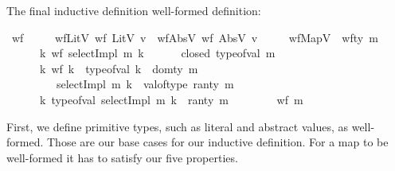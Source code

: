 The final inductive definition well-formed definition:

\begin{isabellebody}\isanewline
{}\isamarkupfalse%
\ wf\ \isanewline
\ \ \ \ wfLitV{\isacharcolon}{\kern0pt}\ {\isachardoublequoteopen}wf\ {\isacharparenleft}{\kern0pt}LitV\ v{\isacharparenright}{\kern0pt}{\isachardoublequoteclose}\ {\isacharbar}{\kern0pt}\ wfAbsV{\isacharcolon}{\kern0pt}\ {\isachardoublequoteopen}wf\ {\isacharparenleft}{\kern0pt}AbsV\ v{\isacharparenright}{\kern0pt}{\isachardoublequoteclose}\ {\isacharbar}{\kern0pt}\isanewline
\ \ \ \ wfMapV{\isacharcolon}{\kern0pt}\ {\isachardoublequoteopen}{\isasymlbrakk}\ wf{\isacharunderscore}{\kern0pt}ty\ m{\isacharsemicolon}{\kern0pt}\isanewline
\ \ \ \ \ \ {\isacharparenleft}{\kern0pt}{\isasymforall}k{\isachardot}{\kern0pt}\ wf\ {\isacharparenleft}{\kern0pt}selectImpl\ m\ k{\isacharparenright}{\kern0pt}{\isacharparenright}{\kern0pt}{\isacharsemicolon}{\kern0pt}\isanewline
\ \ \ \ \ \ closed\ {\isacharparenleft}{\kern0pt}type{\isacharunderscore}{\kern0pt}of{\isacharunderscore}{\kern0pt}val\ m{\isacharparenright}{\kern0pt}{\isacharsemicolon}{\kern0pt}\isanewline
\ \ \ \ \ \ {\isacharparenleft}{\kern0pt}{\isasymforall}k{\isachardot}{\kern0pt}\ {\isacharparenleft}{\kern0pt}{\isasymnot}wf\ k\ {\isasymor}\ type{\isacharunderscore}{\kern0pt}of{\isacharunderscore}{\kern0pt}val\ k\ {\isasymnoteq}\ dom{\isacharunderscore}{\kern0pt}ty\ m{\isacharparenright}{\kern0pt}\isanewline
\ \ \ \ \ \ \ \ {\isasymlongrightarrow}\ {\isacharparenleft}{\kern0pt}selectImpl\ m\ k{\isacharparenright}{\kern0pt}\ {\isacharequal}{\kern0pt}\ val{\isacharunderscore}{\kern0pt}of{\isacharunderscore}{\kern0pt}type\ {\isacharparenleft}{\kern0pt}ran{\isacharunderscore}{\kern0pt}ty\ m{\isacharparenright}{\kern0pt}{\isacharparenright}{\kern0pt}{\isacharsemicolon}{\kern0pt}\isanewline
\ \ \ \ \ \ {\isacharparenleft}{\kern0pt}{\isasymforall}k{\isachardot}{\kern0pt}\ type{\isacharunderscore}{\kern0pt}of{\isacharunderscore}{\kern0pt}val\ {\isacharparenleft}{\kern0pt}selectImpl\ m\ k{\isacharparenright}{\kern0pt}\ {\isacharequal}{\kern0pt}\ ran{\isacharunderscore}{\kern0pt}ty\ m{\isacharparenright}{\kern0pt}\isanewline
\ \ \ \ \ \ {\isasymrbrakk}\ {\isasymLongrightarrow}\ wf\ m{\isachardoublequoteclose}%
\end{isabellebody}

First, we define primitive types, such as literal and abstract values,
as well-formed.
Those are our base cases for our inductive definition.
For a map to be well-formed it has to satisfy our five properties.


